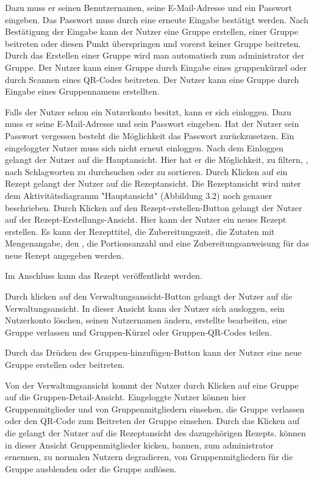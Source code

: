 \documentclass[parskip=full]{scrartcl}
\begin{document}
Dazu muss er seinen Benutzernamen, seine E-Mail-Adresse und ein Passwort eingeben.
Das Passwort muss durch eine erneute Eingabe bestätigt werden.
Nach Bestätigung der Eingabe kann der Nutzer eine Gruppe erstellen, einer Gruppe beitreten oder diesen Punkt überspringen und vorerst keiner Gruppe beitreten.
Durch das Erstellen einer Gruppe wird man automatisch zum \Gls{administrator} der Gruppe.
Der Nutzer kann einer Gruppe durch Eingabe eines \gls{gruppenkürzel} oder durch Scannen eines QR-Codes beitreten.
Der Nutzer kann eine Gruppe durch Eingabe eines Gruppennamens erstellten.

Falls der Nutzer schon ein Nutzerkonto besitzt, kann er sich einloggen.
Dazu muss er seine E-Mail-Adresse und sein Passwort eingeben.
Hat der Nutzer sein Passwort vergessen besteht die Möglichkeit das Passwort zurückzusetzen.
Ein eingeloggter Nutzer muss sich nicht erneut einloggen.\newline
Nach dem Einloggen gelangt der Nutzer auf die Hauptansicht.
Hier hat er die Möglichkeit,  zu filtern, , nach Schlagworten zu durchsuchen oder zu sortieren.
Durch Klicken auf ein Rezept gelangt der Nutzer auf die Rezeptansicht.
Die Rezeptansicht wird unter dem Aktivitätsdiagramm "Hauptansicht" (Abbildung 3.2) noch genauer beschrieben.
Durch Klicken auf den Rezept-erstellen-Button gelangt der Nutzer auf der Rezept-Erstellungs-Ansicht.
Hier kann der Nutzer ein neues Rezept erstellen.
Es kann der Rezepttitel, die Zubereitungszeit, die Zutaten mit Mengenangabe, den , die Portionsanzahl und eine
Zubereitungsanweisung für das neue Rezept angegeben werden.

Im Anschluss kann das Rezept veröffentlicht werden.\par
Durch klicken auf den Verwaltungsansicht-Button
gelangt der Nutzer auf die Verwaltungsansicht.
In dieser Ansicht kann der Nutzer sich ausloggen, sein Nutzerkonto löschen, seinen Nutzernamen ändern,
erstellte  bearbeiten, eine Gruppe verlassen und Gruppen-Kürzel oder Gruppen-QR-Codes teilen.\par
Durch das Drücken des Gruppen-hinzufügen-Button kann der Nutzer eine neue Gruppe erstellen oder beitreten.

Von der Verwaltungsansicht kommt der Nutzer durch Klicken auf eine Gruppe auf die Gruppen-Detail-Ansicht.
Eingeloggte Nutzer können hier Gruppenmitglieder und  von Gruppenmitgliedern einsehen, die Gruppe verlassen oder den QR-Code zum Beitreten der Gruppe einsehen.
Durch das Klicken auf die  gelangt der Nutzer auf die Rezeptansicht des dazugehörigen Rezepts.
 können in dieser Ansicht Gruppenmitglieder \gls{kicken}, \gls{bannen}, zum \Gls{administrator} ernennen,  zu normalen Nutzern degradieren,  von Gruppenmitgliedern für die Gruppe \gls{ausblenden} oder die Gruppe auflösen.\par
\end{document}
